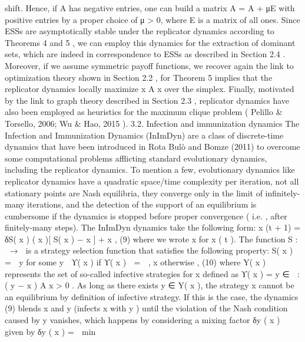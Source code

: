 \documentclass[a4paper]{article}
\begin{document}
shift. Hence, if A has negative entries, one can build a matrix
A = A + μE with positive entries by a proper choice of μ > 0,
where E is a matrix of all ones.
Since ESSs are asymptotically stable under the replicator
dynamics according to Theorems 4 and 5 , we can employ this
dynamics for the extraction of dominant sets, which are indeed in
correspondence to ESSs as described in Section 2.4 . Moreover, if
we assume symmetric payoff functions, we recover again the link
to optimization theory shown in Section 2.2 , for Theorem 5 implies
that the replicator dynamics locally maximize x 	 A x over the
simplex. Finally, motivated by the link to graph theory described
in Section 2.3 , replicator dynamics have also been employed as
heuristics for the maximum clique problem ( Pelillo & Torsello,
2006; Wu & Hao, 2015 ).
3.2. Infection and immunization dynamics
The Infection and Immunization Dynamics (InImDyn) are a class
of discrete-time dynamics that have been introduced in Rota Bulò
and Bomze (2011) to overcome some computational problems
afflicting standard evolutionary dynamics, including the replicator
dynamics. To mention a few, evolutionary dynamics like replicator
dynamics have a quadratic space/time complexity per iteration,
not all stationary points are Nash equilibria, they converge only
in the limit of infinitely-many iterations, and the detection of
the support of an equilibrium is cumbersome if the dynamics is
stopped before proper convergence ( i.e. , after finitely-many steps).
The InImDyn dynamics take the following form:
x (t + 1) = δS( x ) ( x )[ S( x ) − x ] + x , (9)
where we wrote x for x ( t ). The function S :  →  is a strategy
selection function that satisfies the following property:
S( x ) =

y for some y ∈ ϒ( x ) if ϒ( x )  = ∅ ,
x otherwise ,
(10)
where Y( x ) represents the set of so-called infective strategies for x
defined as
ϒ( x ) = { y ∈  : ( y − x )
	 A x > 0 } .
As long as there exists y ∈ Y( x ), the strategy x cannot be an equilibrium
by definition of infective strategy. If this is the case, the
dynamics (9) blends x and y (infects x with y ) until the violation
of the Nash condition caused by y vanishes, which happens by
considering a mixing factor δy ( x ) given by
δy ( x ) =

min
\end{document}
